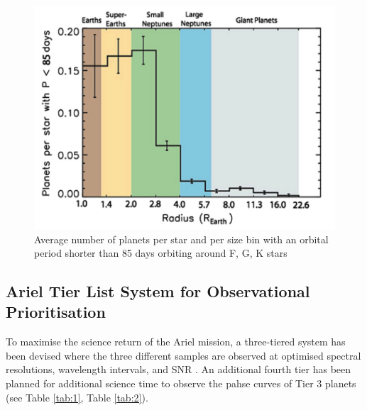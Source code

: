 \documentclass[12pt]{article}
\begin{document}
\begin{figure}[H]
    \centering
    \includegraphics[width=.75\textwidth]{planet w small orbits.png}
    \caption{Average number of planets per star and per size bin with an orbital period shorter than 85 days orbiting around F, G, K stars \protect\cite{zingales2018ariel}}
    \label{fig:9}
\end{figure}

\subsection{Ariel Tier List System for Observational Prioritisation}

To maximise the science return of the Ariel mission, a three-tiered system has been devised where the three different samples are observed at optimised spectral resolutions, wavelength intervals,
and SNR \cite{salvignol2024ariel}. An additional fourth tier has been planned for additional science time to observe the pahse curves of Tier 3 planets \cite{arielstudyreport} (see Table \ref{tab:1}, Table \ref{tab:2}).
\end{document}
